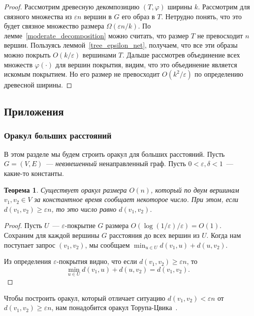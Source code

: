 \documentclass[12pt]{article}
\newcommand{\eps}{\varepsilon}
\newtheorem{theorem}{Теорема}
\begin{document}
\begin{proof}
        Рассмотрим древесную декомпозицию $(T, \varphi)$ ширины $k$. Рассмотрим для связного множества из $\eps n$
        вершин в $G$ его образ в $T$.
        Нетрудно понять, что это будет связное множество размера $\Omega(\eps n / k)$.
        По лемме~\ref{moderate_decomposition} можно считать, что размер $T$ не превосходит $n$ вершин. Пользуясь
        леммой~\ref{tree_epsilon_net}, получаем, что все эти образы можно покрыть $O(k / \eps)$ вершинами $T$.
        Дальше рассмотрев объединение всех множеств $\varphi(\cdot)$ для вершин покрытия, видим, что это объединение является
        искомым покрытием. Но его размер не превосходит $O(k^2 / \eps)$ по определению древесной ширины.
    \end{proof}
    \subsection{Приложения}
    \label{subsection_applications}
    \subsubsection{Оракул больших расстояний}
    \label{subsubsection_distance_oracle}
    В этом разделе мы будем строить оракул для больших расстояний.
    Пусть $G = (V, E)$~--- \emph{невзвешенный} ненаправленный граф.
    Пусть $0 < \eps, \delta < 1$~--- какие-то константы.

    \begin{theorem}
        \label{naive_oracle}
        Существует оракул размера $O(n)$, который по двум вершинам $v_1, v_2 \in V$ за константное время сообщает некоторое
        число. При этом, если $d(v_1, v_2) \geq \eps n$, то это число равно $d(v_1, v_2)$.
    \end{theorem}
    \begin{proof}
        Пусть $U$~--- $\eps$-покрытие $G$ размера $O(\log(1 / \eps) / \eps) = O(1)$.
        Сохраним для каждой вершины $G$ расстояния до всех вершин из $U$.
        Когда нам поступает запрос $(v_1, v_2)$, мы сообщаем $\min_{u \in U} d(v_1, u) + d(u, v_2)$.

        Из определения $\eps$-покрытия видно, что если $d(v_1, v_2) \geq \eps n$, то 
        $$
            \min_{u \in U} d(v_1, u) + d(u, v_2) = d(v_1, v_2).
        $$
    \end{proof}

    Чтобы построить оракул, который отличает ситуацию $d(v_1, v_2) < \eps n$ от $d(v_1, v_2) \geq \eps n$,
    нам понадобится оракул Торупа-Цвика~\cite{TZ05}.
\end{document}
